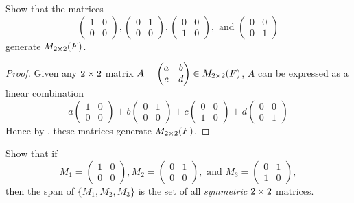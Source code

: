 \begin{exercise} \label{exercise 1.4.9}
Show that the matrices
\[
\begin{pmatrix}
  1 & 0 \\
  0 & 0
\end{pmatrix},
\begin{pmatrix}
  0 & 1 \\
  0 & 0
\end{pmatrix},
\begin{pmatrix}
  0 & 0 \\
  1 & 0
\end{pmatrix}, \text{ and }
\begin{pmatrix}
  0 & 0 \\
  0 & 1
\end{pmatrix}
\]
generate \(M_{2 \times 2}(F)\).
\end{exercise}

\begin{proof}
Given any \(2 \times 2\) matrix
\(A =
    \begin{pmatrix}
        a & b \\ 
        c & d
    \end{pmatrix}  
\in M_{2 \times 2}(F)\),
\(A\) can be expressed as a linear combination
\[
a \begin{pmatrix}
    1 & 0 \\
    0 & 0
\end{pmatrix}
+ b \begin{pmatrix}
    0 & 1 \\
    0 & 0
\end{pmatrix}
+ c \begin{pmatrix}
    0 & 0 \\
    1 & 0
\end{pmatrix}
+ d \begin{pmatrix}
    0 & 0 \\
    0 & 1
\end{pmatrix}
\]
Hence by , these matrices generate \(M_{2 \times 2}(F)\).
\end{proof}

\begin{exercise} \label{exercise 1.4.10}
Show that if
\[
M_1 = \begin{pmatrix}
  1 & 0 \\
  0 & 0
\end{pmatrix},
M_2 = \begin{pmatrix}
  0 & 1 \\
  0 & 0
\end{pmatrix}, \text{ and }
M_3 = \begin{pmatrix}
  0 & 1 \\
  1 & 0
\end{pmatrix},
\]
then the span of \(\{M_1, M_2, M_3\}\) is the set of all \emph{symmetric} \(2 \times 2\) matrices.
\end{exercise}

